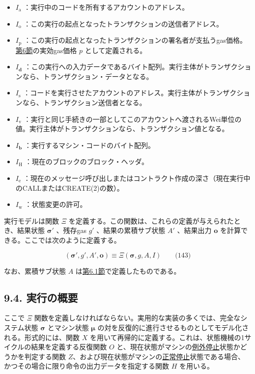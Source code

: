 \documentclass[
]{ltjsarticle}
\begin{document}
\begin{itemize}
\item
  \(I_{\mathrm{a}}\) ：実行中のコードを所有するアカウントのアドレス。
\item
  \(I_{\mathrm{o}}\)
  ：この実行の起点となったトランザクションの送信者アドレス。
\item
  \(I_{\mathrm{p}}\)
  ：この実行の起点となったトランザクションの署名者が支払うgas価格。\protect\hyperlink{ch:transactions}{第6節}の実効gas価格
  \protect\hyperlink{effective_gas_price_p}{\(p\)} として定義される。
\item
  \(I_{\mathbf{d}}\)
  ：この実行への入力データであるバイト配列。実行主体がトランザクションなら、トランザクション・データとなる。
\item
  \(I_{\mathrm{s}}\)
  ：コードを実行させたアカウントのアドレス。実行主体がトランザクションなら、トランザクション送信者となる。
\item
  \(I_{\mathrm{v}}\)
  ：実行と同じ手続きの一部としてこのアカウントへ渡されるWei単位の値。実行主体がトランザクションなら、トランザクション値となる。
\item
  \(I_{\mathbf{b}}\) ：実行するマシン・コードのバイト配列。
\item
  \(I_{\mathrm{H}}\) ：現在のブロックのブロック・ヘッダ。
\item
  \(I_{\mathrm{e}}\)
  ：現在のメッセージ呼び出しまたはコントラクト作成の深さ（現在実行中のCALLまたはCREATE(2)の数）。
\item
  \(I_{\mathrm{w}}\) ：状態変更の許可。
\end{itemize}

実行モデルは関数 \(\Xi\)
を定義する。この関数は、これらの定義が与えられたとき、結果状態
\(\boldsymbol{\sigma}'\) 、残存gas \(g'\) 、結果の累積サブ状態 \(A'\)
、結果出力 \(\mathbf{o}\) を計算できる。ここでは次のように定義する。

\protect\hypertarget{eq-143}{}{}

\[(\boldsymbol{\sigma}', g', A', \mathbf{o}) \equiv \Xi(\boldsymbol{\sigma}, g, A, I) \qquad \text{(143)}\]

なお、累積サブ状態 \(A\)
は\protect\hyperlink{ch:substate}{第6.1節}で定義したものである。

\hypertarget{ux5b9fux884cux306eux6982ux8981}{%
\subsection{9.4. 実行の概要}\label{ux5b9fux884cux306eux6982ux8981}}

ここで \(\Xi\)
関数を定義しなければならない。実用的な実装の多くでは、完全なシステム状態
\(\boldsymbol{\sigma}\) とマシン状態 \(\boldsymbol{\mu}\)
の対を反復的に進行させるものとしてモデル化される。形式的には、関数 \(X\)
を用いて再帰的に定義する。これは、状態機械の1サイクルの結果を定義する反復関数
\(O\)
と、現在状態がマシンの\protect\hyperlink{zhalt}{例外停止}状態かどうかを判定する関数
\protect\hyperlink{zhalt}{\(Z\)}、および現在状態がマシンの\protect\hyperlink{hhalt}{正常停止}状態である場合、かつその場合に限り命令の出力データを指定する関数
\protect\hyperlink{hhalt}{\(H\)} を用いる。
\end{document}
